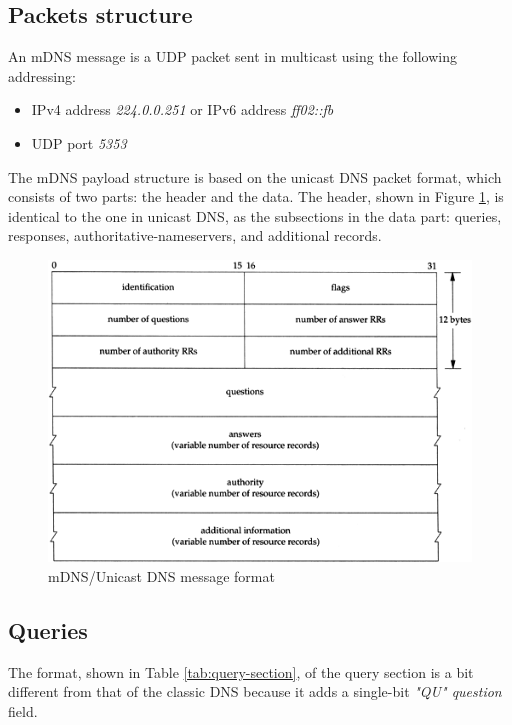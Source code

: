 \documentclass[fleqn, 11pt]{SelfArx} %
\begin{document}
\subsection{Packets structure}
An mDNS message is a UDP packet sent in multicast using the following addressing:
\begin{itemize}[leftmargin=*]
    \item IPv4 address \textit{224.0.0.251} or IPv6 address \textit{ff02::fb}
    \item UDP port \textit{5353}
\end{itemize}
The mDNS payload structure is based on the unicast DNS packet format, which consists of two parts: the header and the data.\newline
The header, shown in Figure \ref{fig:msdns-message-1}, is identical to the one in unicast DNS, as the subsections in the data part: queries, responses, authoritative-nameservers, and additional records.
\begin{figure}[H]\centering
    \includegraphics[width=\linewidth]{./msg-format.png}
    \caption{mDNS/Unicast DNS message format}
    \label{fig:msdns-message-1}
\end{figure}

\subsection{Queries}
The format, shown in Table \ref{tab:query-section}, of the query section is a bit different from that of the classic DNS because it adds a single-bit {\it{"QU" question}} field. \newline
\end{document}
